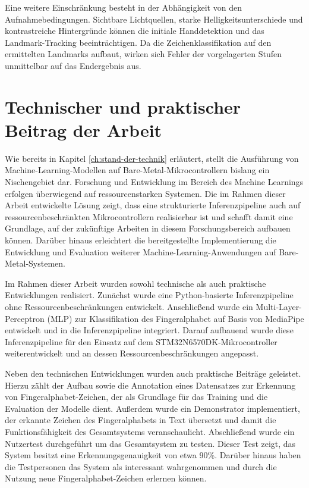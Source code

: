 Eine weitere Einschränkung besteht in der Abhängigkeit von den Aufnahmebedingungen. Sichtbare Lichtquellen, starke Helligkeitsunterschiede und kontrastreiche Hintergründe können die initiale Handdetektion und das Landmark-Tracking beeinträchtigen. Da die Zeichenklassifikation auf den ermittelten Landmarks aufbaut, wirken sich Fehler der vorgelagerten Stufen unmittelbar auf das Endergebnis aus.

\section{Technischer und praktischer Beitrag der Arbeit}\label{sec:beitragderarbeit}

Wie bereits in Kapitel \ref{ch:stand-der-technik} erläutert, stellt die Ausführung von Machine-Learning-Modellen auf Bare-Metal-Mikrocontrollern bislang ein Nischengebiet dar. Forschung und Entwicklung im Bereich des Machine Learnings erfolgen überwiegend auf ressourcenstarken Systemen. Die im Rahmen dieser Arbeit entwickelte Lösung zeigt, dass eine strukturierte Inferenzpipeline auch auf ressourcenbeschränkten Mikrocontrollern realisierbar ist und schafft damit eine Grundlage, auf der zukünftige Arbeiten in diesem Forschungsbereich aufbauen können. Darüber hinaus erleichtert die bereitgestellte Implementierung die Entwicklung und Evaluation weiterer Machine-Learning-Anwendungen auf Bare-Metal-Systemen.

Im Rahmen dieser Arbeit wurden sowohl technische als auch praktische Entwicklungen realisiert. Zunächst wurde eine Python-basierte Inferenzpipeline ohne Ressourcenbeschränkungen entwickelt. Anschließend wurde ein Multi-Layer-Perceptron (MLP) zur Klassifikation des Fingeralphabet auf Basis von MediaPipe entwickelt und in die Inferenzpipeline integriert. Darauf aufbauend wurde diese Inferenzpipeline für den Einsatz auf dem \linebreak STM32N6570DK-Mikrocontroller weiterentwickelt und an dessen Ressourcenbeschränkungen angepasst.

Neben den technischen Entwicklungen wurden auch praktische Beiträge geleistet. Hierzu zählt der Aufbau sowie die Annotation eines Datensatzes zur Erkennung von Fingeralphabet-Zeichen, der als Grundlage für das Training und die Evaluation der Modelle dient. Außerdem wurde ein Demonstrator implementiert, der erkannte Zeichen des Fingeralphabets in Text übersetzt und damit die Funktionsfähigkeit des Gesamtsystems veranschaulicht. Abschließend wurde ein Nutzertest durchgeführt um das Gesamtsystem zu testen. Dieser Test zeigt, das System besitzt eine Erkennungsgenauigkeit von etwa 90\%. Darüber hinaus haben die Testpersonen das System als interessant wahrgenommen und durch die Nutzung neue Fingeralphabet-Zeichen erlernen können.
